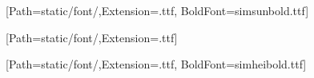 

[Path=static/font/,Extension=.ttf, BoldFont=simsunbold.ttf]
\renewcommand{\songti}{\CJKfamily{simsun}}

[Path=static/font/,Extension=.ttf]
\renewcommand{\fangsong}{\CJKfamily{simfang}}

[Path=static/font/,Extension=.ttf, BoldFont=simheibold.ttf]
\renewcommand{\heiti}{\CJKfamily{simhei}}


\newcommand{\maintitle}{\fontsize{36pt}{36pt}}                %
\newcommand{\yihao}{\fontsize{26pt}{26pt}\selectfont}       %
\newcommand{\xiaoyi}{\fontsize{24pt}{24pt}\selectfont}      %
\newcommand{\erhao}{\fontsize{22pt}{1.25\baselineskip}\selectfont}       %
\newcommand{\xiaoer}{\fontsize{18pt}{18pt}\selectfont}      %
\newcommand{\sanhao}{\fontsize{16pt}{16pt}\selectfont}      %
\newcommand{\xiaosan}{\fontsize{15pt}{15pt}\selectfont}     %
\newcommand{\sihao}{\fontsize{14pt}{14pt}\selectfont}       %
\newcommand{\xiaosi}{\fontsize{12pt}{12pt}\selectfont}      %
\newcommand{\wuhao}{\fontsize{10.5pt}{10.5pt}\selectfont}   %
\newcommand{\xiaowu}{\fontsize{9pt}{9pt}\selectfont}        %

\newcommand{\xfsm}{\songti\xiaosi\setstretch{1.63}} 
\newcommand{\xfbody}{\songti\xiaosi\setstretch{1.95}} 
\newcommand{\xfabstract}{\fangsong\xiaosi\setstretch{1.95}}
\newcommand{\xfenabstract}{\fangsong\xiaosi\setstretch{1.73}}




\newcommand\prechaptername{第}
\newcommand\postchaptername{章}


